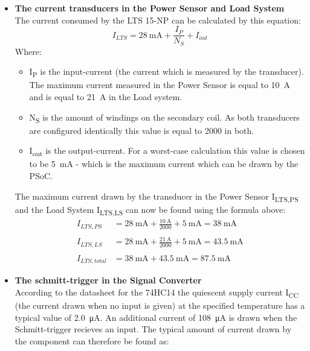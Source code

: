 \begin{itemize}
	\item \textbf{The current transducers in the Power Sensor and Load System}\\
	The current consumed by the LTS 15-NP can be calculated by this equation:
	\begin{equation}
		I_{LTS} = \SI{28}{\milli \ampere} + \frac{I_P}{N_S} + I_{out}
	\end{equation}
	Where:
	\begin{itemize}
		\item I\textsubscript{P} is the input-current (the current which is measured by the transducer). The maximum current measured in the Power Sensor is equal to \SI{10}{\ampere} and is equal to \SI{21}{\ampere} in the Load system.
		\item N\textsubscript{S} is the amount of windings on the secondary coil. As both transducers are configured identically this value is equal to 2000 in both.
		\item I\textsubscript{out} is the output-current. For a worst-case calculation this value is chosen to be \SI{5}{\milli \ampere} - which is the maximum current which can be drawn by the PSoC.
	\end{itemize}
	The maximum current drawn by the transducer in the Power Sensor I\textsubscript{LTS,PS} and the Load System I\textsubscript{LTS,LS} can now be found using the formula above:
	\begin{equation}
	\begin{split}
	I_{LTS,PS} &= \SI{28}{\milli \ampere} + \frac{\SI{10}{\ampere}}{2000} + \SI{5}{\milli \ampere} = \SI{38}{\milli \ampere}\\
	\\
	I_{LTS,LS} &= \SI{28}{\milli \ampere} + \frac{\SI{21}{\ampere}}{2000} + \SI{5}{\milli \ampere} = \SI{43.5}{\milli \ampere}\\
	\\
	I_{LTS,total} &= \SI{38}{\milli \ampere} + \SI{43.5}{\milli \ampere} = \SI{87.5}{\milli \ampere}
	\end{split}
	\end{equation}
	\item \textbf{The schmitt-trigger in the Signal Converter}\\
	According to the datasheet for the 74HC14 the quiescent supply current I\textsubscript{CC} (the current drawn when no input is given) at the specified temperature has a typical value of \SI{2.0}{\micro \ampere}. An additional current of \SI{108}{\micro \ampere} is drawn when the Schmitt-trigger recieves an input. The typical amount of current drawn by the component can therefore be found as:

\end{itemize}
